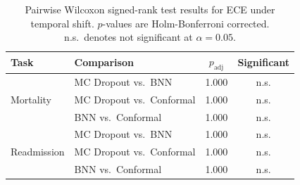 \documentclass[11pt,a4paper]{article}
\begin{document}
\begin{table}[htbp]
\centering
\caption{Pairwise Wilcoxon signed-rank test results for ECE under temporal shift. $p$-values are Holm-Bonferroni corrected. n.s.\ denotes not significant at $\alpha=0.05$.}
\label{tab:stats}
\small
\begin{tabular}{llcc}
\toprule
Task & Comparison & $p_{\text{adj}}$ & Significant \\
\midrule
\multirow{3}{*}{Mortality}
  & MC Dropout vs.\ BNN       & 1.000 & n.s. \\
  & MC Dropout vs.\ Conformal & 1.000 & n.s. \\
  & BNN vs.\ Conformal        & 1.000 & n.s. \\
\midrule
\multirow{3}{*}{Readmission}
  & MC Dropout vs.\ BNN       & 1.000 & n.s. \\
  & MC Dropout vs.\ Conformal & 1.000 & n.s. \\
  & BNN vs.\ Conformal        & 1.000 & n.s. \\
\bottomrule
\end{tabular}
\end{table}
\end{document}
